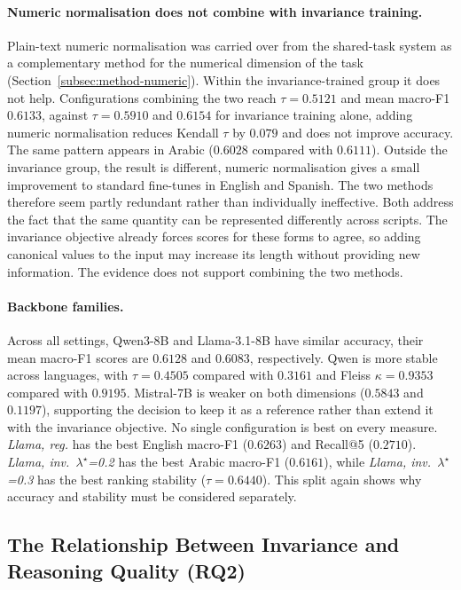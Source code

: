 \paragraph{Numeric normalisation does not combine with invariance training.}
Plain-text numeric normalisation was carried over from the shared-task system as a complementary method
for the numerical dimension of the task (Section~\ref{subsec:method-numeric}). Within the
invariance-trained group it does not help. Configurations combining the two reach $\tau = 0.5121$ and
mean macro-F1 $0.6133$, against $\tau = 0.5910$ and $0.6154$ for invariance training alone, adding
numeric normalisation reduces Kendall $\tau$ by $0.079$ and does not improve accuracy. The same
pattern appears in Arabic ($0.6028$ compared with $0.6111$). Outside the invariance group, the result
is different, numeric normalisation gives a small improvement to standard fine-tunes in English and
Spanish. The two methods therefore seem partly redundant rather than individually ineffective. Both
address the fact that the same quantity can be represented differently across scripts. The invariance
objective already forces scores for these forms to agree, so adding canonical values to the input may
increase its length without providing new information. The evidence does not support combining the
two methods.

\paragraph{Backbone families.}
Across all settings, Qwen3-8B and Llama-3.1-8B have similar accuracy, their mean macro-F1 scores are
$0.6128$ and $0.6083$, respectively. Qwen is more stable across languages, with $\tau = 0.4505$
compared with $0.3161$ and Fleiss $\kappa = 0.9353$ compared with $0.9195$. Mistral-7B is weaker on
both dimensions ($0.5843$ and $0.1197$), supporting the decision to keep it as a reference rather
than extend it with the invariance objective. No single configuration is best on every measure.
\emph{Llama, reg.} has the best English macro-F1 ($0.6263$) and Recall@5 ($0.2710$).
\emph{Llama, inv.\ $\lambda^\star$=0.2} has the best Arabic macro-F1 ($0.6161$), while
\emph{Llama, inv.\ $\lambda^\star$=0.3} has the best ranking stability ($\tau = 0.6440$). This split
again shows why accuracy and stability must be considered separately.

\subsection{The Relationship Between Invariance and Reasoning Quality (RQ2)}
\label{subsec:res-relationship}

